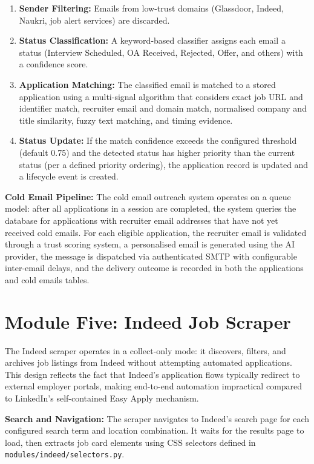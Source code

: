 \documentclass[12pt, a4paper, oneside]{report}
\begin{document}
\begin{enumerate}
    \item \textbf{Sender Filtering:} Emails from low-trust domains (Glassdoor, Indeed, Naukri, job alert services) are discarded.
    \item \textbf{Status Classification:} A keyword-based classifier assigns each email a status (Interview Scheduled, OA Received, Rejected, Offer, and others) with a confidence score.
    \item \textbf{Application Matching:} The classified email is matched to a stored application using a multi-signal algorithm that considers exact job URL and identifier match, recruiter email and domain match, normalised company and title similarity, fuzzy text matching, and timing evidence.
    \item \textbf{Status Update:} If the match confidence exceeds the configured threshold (default 0.75) and the detected status has higher priority than the current status (per a defined priority ordering), the application record is updated and a lifecycle event is created.
\end{enumerate}

\textbf{Cold Email Pipeline:} The cold email outreach system operates on a queue model: after all applications in a session are completed, the system queries the database for applications with recruiter email addresses that have not yet received cold emails. For each eligible application, the recruiter email is validated through a trust scoring system, a personalised email is generated using the AI provider, the message is dispatched via authenticated SMTP with configurable inter-email delays, and the delivery outcome is recorded in both the applications and cold emails tables.

\section{Module Five: Indeed Job Scraper}
\label{sec:module-five}

The Indeed scraper operates in a collect-only mode: it discovers, filters, and archives job listings from Indeed without attempting automated applications. This design reflects the fact that Indeed's application flows typically redirect to external employer portals, making end-to-end automation impractical compared to LinkedIn's self-contained Easy Apply mechanism.

\textbf{Search and Navigation:} The scraper navigates to Indeed's search page for each configured search term and location combination. It waits for the results page to load, then extracts job card elements using CSS selectors defined in \texttt{modules/indeed/selectors.py}.
\end{document}
